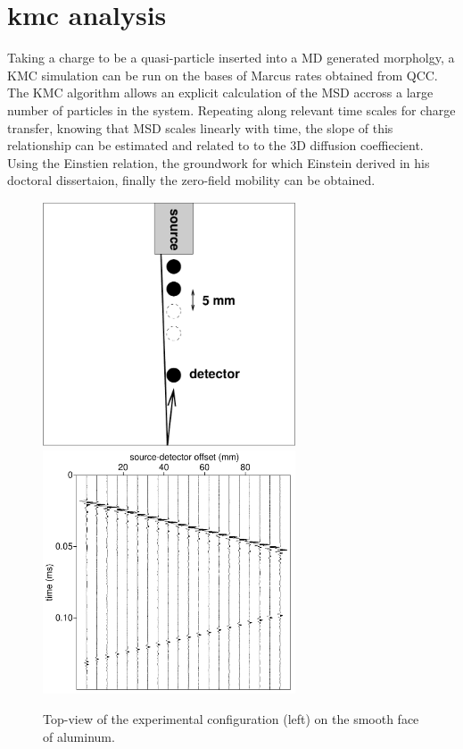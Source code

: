 \section{\nobreak kmc analysis}
Taking a charge to be a quasi-particle inserted into a MD generated morpholgy, a KMC
simulation can be run on the bases of Marcus rates obtained from QCC.
The KMC algorithm allows an explicit calculation of the MSD accross a large number of 
particles in the system. Repeating along relevant time scales for 
charge transfer, knowing that MSD scales linearly with time, the slope of this relationship
can be estimated and related to to the 3D diffusion coeffiecient. Using the Einstien relation, 
the groundwork for which Einstein derived in his doctoral dissertaion, finally the zero-field
mobility can be obtained. 

\begin{figure}
  \center
  \includegraphics[width=7.5cm]{figures/setup}
  \includegraphics[width=7.5cm]{figures/exp0}
  \caption{Top-view of the experimental configuration (left) on the
    smooth face of aluminum.}
  \label{fig:figure}
\end{figure}

